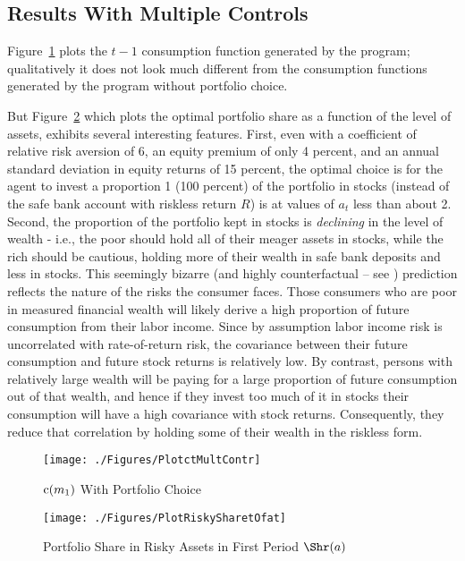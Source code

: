 \documentclass[titlepage, headings=optiontotocandhead]{Resources/texmf-local/tex/latex/econtex}
\begin{document}
\hypertarget{results-with-multiple-controls}{}
\subsection{Results With Multiple Controls}\label{subsec:results-with-multiple-controls}

Figure~\ref{fig:PlotctMultContr} plots the $t-1$ consumption function generated by the program; qualitatively it does not look much different from the consumption functions generated by the program without portfolio choice.

But Figure~\ref{fig:PlotRiskySharetOfat} which plots the optimal portfolio share as a function of the level of assets, exhibits several interesting features.  First, even with a coefficient of relative risk aversion of 6, an equity premium of only 4 percent, and an annual standard deviation in equity returns of 15 percent, the optimal choice is for the agent to invest a proportion 1 (100 percent) of the portfolio in stocks (instead of the safe bank account with riskless return $R$) is at values of $a_{t}$ less than about 2.  Second, the proportion of the portfolio kept in stocks is \textit{declining} in the level of wealth - i.e., the poor should hold all of their meager assets in stocks, while the rich should be cautious, holding more of their wealth in safe bank deposits and less in stocks.  This seemingly bizarre (and highly counterfactual -- see \cite{carroll:richportfolios}) prediction reflects the nature of the risks the consumer faces.  Those consumers who are poor in measured financial wealth will likely derive a high proportion of future consumption from their labor income.  Since by assumption labor income risk is uncorrelated with rate-of-return risk, the covariance between their future consumption and future stock returns is relatively low.  By contrast, persons with relatively large wealth will be paying for a large proportion of future consumption out of that wealth, and hence if they invest too much of it in stocks their consumption will have a high covariance with stock returns.  Consequently, they reduce that correlation by holding some of their wealth in the riskless form.

\hypertarget{PlotctMultContr}{}
\begin{figure}
  \texttt{[image: ./Figures/PlotctMultContr]}
  \caption{$\mathrm{c}(m_{1})$ With Portfolio Choice}
  \label{fig:PlotctMultContr}
\end{figure}

\hypertarget{PlotRiskySharetOfat}{}
\begin{figure}
  \texttt{[image: ./Figures/PlotRiskySharetOfat]}
  \caption{Portfolio Share in Risky Assets in First Period $\Shr(a)$}
  \label{fig:PlotRiskySharetOfat}
\end{figure}
\end{document}
